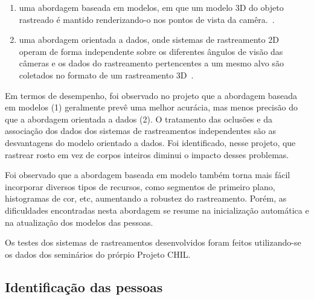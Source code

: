 	\begin{enumerate}
		\item uma abordagem baseada em modelos, em que um modelo 3D do objeto rastreado é mantido renderizando-o nos pontos de vista da camêra.~\cite{chilref1,chilref2,chilref3}.
		\item  uma abordagem orientada a dados, onde sistemas de rastreamento 2D operam de forma independente sobre os diferentes ângulos de visão das câmeras e os dados do rastreamento pertencentes a um mesmo alvo são coletados no formato de um rastreamento 3D~\cite{chilref4,chilref5}.
	\end{enumerate}	

 Em termos de desempenho, foi observado no projeto que a abordagem baseada em modelos (1) geralmente prevê uma melhor acurácia, mas menos precisão do que a abordagem orientada a dados (2).  O tratamento das oclusões e da associação dos dados dos sistemas de rastreamentos independentes são as desvantagens do modelo orientado a dados. Foi identificado,  nesse projeto, que rastrear rosto em vez de corpos inteiros diminui o impacto desses problemas.

 Foi observado que a abordagem baseada em modelo também torna mais fácil incorporar diversos tipos de recursos, como segmentos de primeiro plano, histogramas de cor, etc, aumentando a robustez do rastreamento. Porém, as dificuldades encontradas nesta abordagem se resume na inicialização automática e na atualização dos modelos das pessoas.

 Os testes dos sistemas de rastreamentos desenvolvidos foram feitos utilizando-se os dados dos seminários do prórpio Projeto CHIL.



\subsection{Identificação das pessoas}


